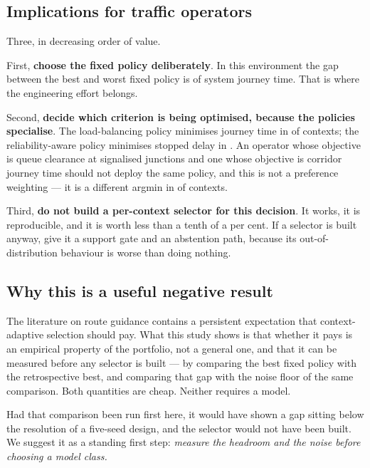 \subsection{Implications for traffic operators}

Three, in decreasing order of value.

First, \textbf{choose the fixed policy deliberately}. In this environment the
gap between the best and worst fixed policy is \NumFixedWorstPenaltyPct{} of
system journey time. That is where the engineering effort belongs.

Second, \textbf{decide which criterion is being optimised, because the policies
specialise}. The load-balancing policy minimises journey time in
\NumSpecCOneN{} of \NumContextsAnalysed{} contexts; the reliability-aware policy
minimises stopped delay in \NumSpecCThreeN{}. An operator whose objective is
queue clearance at signalised junctions and one whose objective is corridor
journey time should not deploy the same policy, and this is not a preference
weighting --- it is a different argmin in \NumBestCThreeDiffersPct{} of
contexts.

Third, \textbf{do not build a per-context selector for this decision}. It works,
it is reproducible, and it is worth less than a tenth of a per cent. If a
selector is built anyway, give it a support gate and an abstention path, because
its out-of-distribution behaviour is worse than doing nothing.

\subsection{Why this is a useful negative result}

The literature on route guidance contains a persistent expectation that
context-adaptive selection should pay. What this study shows is that whether it
pays is an empirical property of the portfolio, not a general one, and that it
can be measured before any selector is built --- by comparing the best fixed
policy with the retrospective best, and comparing that gap with the noise floor
of the same comparison. Both quantities are cheap. Neither requires a model.

Had that comparison been run first here, it would have shown a
\NumHeadroomPct{} gap sitting below the resolution of a five-seed design, and
the selector would not have been built. We suggest it as a standing first step:
\emph{measure the headroom and the noise before choosing a model class.}
